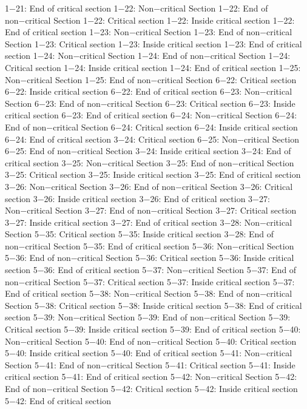 1−21: End of critical section
1−22: Non−critical Section
1−22: End of non−critical Section
1−22: Critical section
1−22: Inside critical section
1−22: End of critical section
1−23: Non−critical Section
1−23: End of non−critical Section
1−23: Critical section
1−23: Inside critical section
1−23: End of critical section
1−24: Non−critical Section
1−24: End of non−critical Section
1−24: Critical section
1−24: Inside critical section
1−24: End of critical section
1−25: Non−critical Section
1−25: End of non−critical Section
6−22: Critical section
6−22: Inside critical section
6−22: End of critical section
6−23: Non−critical Section
6−23: End of non−critical Section
6−23: Critical section
6−23: Inside critical section
6−23: End of critical section
6−24: Non−critical Section
6−24: End of non−critical Section
6−24: Critical section
6−24: Inside critical section
6−24: End of critical section
3−24: Critical section
6−25: Non−critical Section
6−25: End of non−critical Section
3−24: Inside critical section
3−24: End of critical section
3−25: Non−critical Section
3−25: End of non−critical Section
3−25: Critical section
3−25: Inside critical section
3−25: End of critical section
3−26: Non−critical Section
3−26: End of non−critical Section
3−26: Critical section
3−26: Inside critical section
3−26: End of critical section
3−27: Non−critical Section
3−27: End of non−critical Section
3−27: Critical section
3−27: Inside critical section
3−27: End of critical section
3−28: Non−critical Section
5−35: Critical section
5−35: Inside critical section
3−28: End of non−critical Section
5−35: End of critical section
5−36: Non−critical Section
5−36: End of non−critical Section
5−36: Critical section
5−36: Inside critical section
5−36: End of critical section
5−37: Non−critical Section
5−37: End of non−critical Section
5−37: Critical section
5−37: Inside critical section
5−37: End of critical section
5−38: Non−critical Section
5−38: End of non−critical Section
5−38: Critical section
5−38: Inside critical section
5−38: End of critical section
5−39: Non−critical Section
5−39: End of non−critical Section
5−39: Critical section
5−39: Inside critical section
5−39: End of critical section
5−40: Non−critical Section
5−40: End of non−critical Section
5−40: Critical section
5−40: Inside critical section
5−40: End of critical section
5−41: Non−critical Section
5−41: End of non−critical Section
5−41: Critical section
5−41: Inside critical section
5−41: End of critical section
5−42: Non−critical Section
5−42: End of non−critical Section
5−42: Critical section
5−42: Inside critical section
5−42: End of critical section

